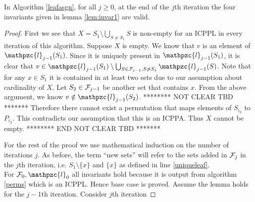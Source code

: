 \documentclass{llncs}
\def\cF{{\cal F}}
\def\cl{\mathpzc{l}}
\begin{document}
\begin{lemma}
\label{lem:invar3}
In Algorithm \ref{leafasgn}, for all $j \geq 0$, at the end of the
$j$th iteration the four invariants given in lemma \ref{lem:invar1}
are valid.  
\end{lemma}
\begin{proof}
  First we see that $X = S_1 \setminus \bigcup_{S \ne S_1}S$ is
  non-empty for an ICPPL in every iteration of this algorithm. Suppose
  $X$ is empty. We know that $v$ is an element of
  $\cl_{j-1}(S_1)$. Since it is uniquely present in $\cl_{j-1}(S_1)$,
  it is clear that $v \in \cl_{j-1}(S_1) \setminus \bigcup_{S \in
    \cF_{j-1}, S \ne S_1}\cl_{j-1}(S)$.  Note that for any $x \in S_1$
  it is contained in at least two sets due to our assumption about
  cardinality of $X$. Let $S_2 \in \cF_{j-1}$ be another set that
  contains $x$. From the above argument, we know $v \notin
  \cl_{j-1}(S_2)$. ******** NOT CLEAR TBD ******* Therefore there cannot exist a
  permutation that maps elements of $S_{i_2}$ to $P_{i_2}$. This
  contradicts our assumption that this is an ICPPA. Thus $X$ cannot be
  empty. ******** END NOT CLEAR TBD *******

  \noindent
  For the rest of the proof we use mathematical induction on the
  number of iterations $j$. As before, the term ``new sets'' will
  refer to the sets added in $\cF_j$ in the $j$th iteration, i.e. $S_1
  \setminus \{x\}$ and $\{x\}$ as defined in line \ref{uniqueleaf}.\\
  For $\cF_0, \cl_0$ all invariants hold because it is output from
  algorithm \ref{perms} which is an ICPPL. Hence base case is proved.
  Assume the lemma holds for the $j-1$th iteration. Consider $j$th
  iteration 


\end{proof}
\end{document}
